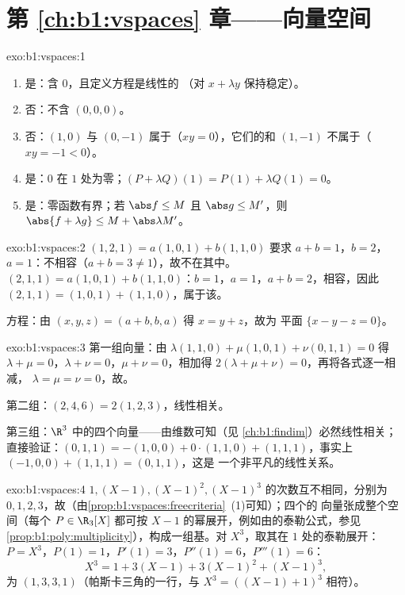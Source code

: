 \section*{第 \ref{ch:b1:vspaces} 章——向量空间}

\begin{solution}{exo:b1:vspaces:1}
\begin{enumerate}
  \item 是：含 $0$，且定义方程是线性的
        （对 $x + \lambda y$ 保持稳定）。
  \item 否：不含 $(0,0,0)$。
  \item 否：$(1, 0)$ 与 $(0, -1)$ 属于（$xy = 0$），它们的和 $(1,
        -1)$ 不属于（$xy = -1 < 0$）。
  \item 是：$0$ 在 $1$ 处为零；$(P + \lambda Q)(1) = P(1) +
        \lambda Q(1) = 0$。
  \item 是：零函数有界；若 $\abs f \leq M$ 且
        $\abs g \leq M'$，则 $\abs{f + \lambda g} \leq M +
        \abs\lambda M'$。
\end{enumerate}
\end{solution}

\begin{solution}{exo:b1:vspaces:2}
$(1,2,1) = a(1,0,1) + b(1,1,0)$ 要求 $a + b = 1$，$b = 2$，$a =
1$：不相容（$a + b = 3 \neq 1$），故不在其中。$(2,1,1) =
a(1,0,1) + b(1,1,0)$：$b = 1$，$a = 1$，$a + b = 2$，相容，因此
$(2,1,1) = (1,0,1) + (1,1,0)$，属于该。

方程：由 $(x, y, z) = (a + b, b, a)$ 得 $x = y + z$，故为
平面 $\{x - y - z = 0\}$。
\end{solution}

\begin{solution}{exo:b1:vspaces:3}
第一组向量：由 $\lambda(1,1,0) + \mu(1,0,1) + \nu(0,1,1) = 0$ 得
$\lambda + \mu = 0$，$\lambda + \nu = 0$，$\mu + \nu = 0$，相加得
$2(\lambda + \mu + \nu) = 0$，再将各式逐一相减，
$\lambda = \mu = \nu = 0$，故。

第二组：$(2,4,6) = 2(1,2,3)$，线性相关。

第三组：$\R^3$ 中的四个向量——由维数可知（见
\cref{ch:b1:findim}）必然线性相关；直接验证：$(0,1,1) = -(1,0,0) +
0\cdot(1,1,0) + (1,1,1)$，事实上 $(-1,0,0) + (1,1,1) = (0,1,1)$，这是
一个非平凡的线性关系。
\end{solution}

\begin{solution}{exo:b1:vspaces:4}
 $1, (X-1), (X-1)^2, (X-1)^3$ 的次数互不相同，分别为 $0,
1, 2, 3$，故（由\cref{prop:b1:vspaces:freecriteria}~(1)可知）；四个的
向量张成整个空间（每个 $P \in \R_3[X]$ 都可按 $X -
1$ 的幂展开，例如由的泰勒公式，参见
\cref{prop:b1:poly:multiplicity}），构成一组基。对 $X^3$，取其在
$1$ 处的泰勒展开：$P = X^3$，$P(1) = 1$，$P'(1) = 3$，$P''(1) = 6$，$P'''(1) =
6$：
\[
X^3 = 1 + 3(X - 1) + 3(X-1)^2 + (X-1)^3 ,
\]
为 $(1, 3, 3, 1)$（帕斯卡三角的一行，与 $X^3 =
((X-1)+1)^3$ 相符）。
\end{solution}

